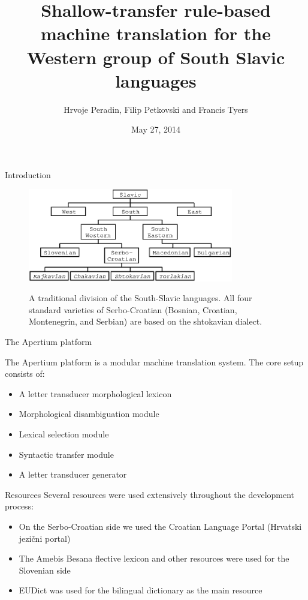 \documentclass{beamer}
\title{Shallow-transfer rule-based machine translation for the Western group of South Slavic languages}
\author{
	Hrvoje Peradin, Filip Petkovski and Francis Tyers
}
\date{May 27, 2014}
\begin{document}
\begin{frame}
  \titlepage
\end{frame}
\begin{frame}{Introduction}

\begin{center}
	\begin{figure}
	\includegraphics[width=0.8\textwidth]{images/chart.eps}
	\label{fig:1}
	\caption{A traditional division of the South-Slavic languages. All four standard varieties of Serbo-Croatian (Bosnian, Croatian,
Montenegrin, and Serbian) are based on the shtokavian dialect.}
	\end{figure}
\end{center}
\end{frame}

\begin{frame}{The Apertium platform}

The Apertium platform is a modular machine translation system.
The core setup consists of:
\begin{itemize}
\item A letter transducer morphological lexicon
\item Morphological disambiguation module
\item Lexical selection module
\item Syntactic transfer module
\item A letter transducer generator
\end{itemize}
\end{frame}

\begin{frame}{Resources}
Several resources were used extensively throughout the development process:
\begin{itemize}
\item On the Serbo-Croatian side we used the Croatian Language Portal (Hrvatski jezični portal)
\item The Amebis Besana flective lexicon and other resources were used for the Slovenian side
\item EUDict was used for the bilingual dictionary as the main resource

\end{itemize}
\end{frame}
\end{document}

